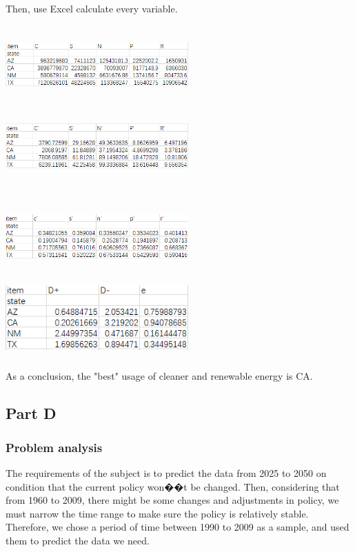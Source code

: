 \documentclass[12pt]{article}
\begin{document}
Then, use Excel calculate every variable.

\includegraphics[width=7cm,height=3cm]{c2.png}
\includegraphics[width=7cm,height=3cm]{c3.png}

\includegraphics[width=7cm,height=3cm]{c4.png}
\includegraphics[width=7cm,height=3cm]{c5.png}

As a conclusion, the "best" usage of cleaner and renewable energy is CA.

\subsection{Part \uppercase\expandafter{}  D}

\subsubsection{Problem analysis}

 The requirements of the subject is to predict the data from 2025 to 2050 on condition that the current policy won��t be changed. Then, considering that from 1960 to 2009, there might be some changes and adjustments in policy, we must narrow the time range to make sure the policy is relatively stable. Therefore, we chose a period of time between 1990 to 2009 as a sample, and used them to predict the data we need.
\end{document}
